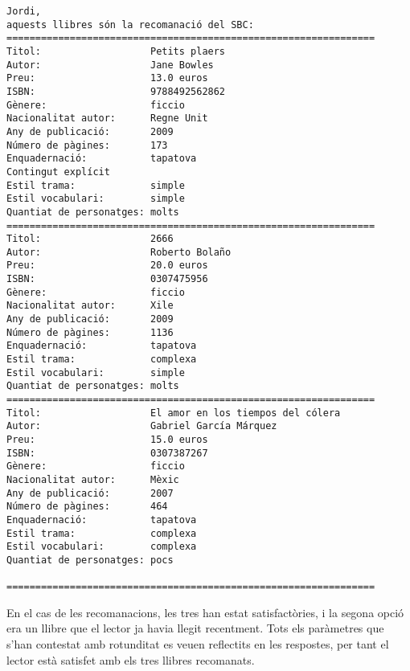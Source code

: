 \begin{verbatim}
Jordi, 
aquests llibres són la recomanació del SBC: 
================================================================
Titol:                   Petits plaers
Autor:                   Jane Bowles
Preu:                    13.0 euros
ISBN:                    9788492562862
Gènere:                  ficcio
Nacionalitat autor:      Regne Unit
Any de publicació:       2009
Número de pàgines:       173
Enquadernació:           tapatova
Contingut explícit
Estil trama:             simple
Estil vocabulari:        simple
Quantiat de personatges: molts
================================================================
Titol:                   2666
Autor:                   Roberto Bolaño
Preu:                    20.0 euros
ISBN:                    0307475956
Gènere:                  ficcio
Nacionalitat autor:      Xile
Any de publicació:       2009
Número de pàgines:       1136
Enquadernació:           tapatova
Estil trama:             complexa
Estil vocabulari:        simple
Quantiat de personatges: molts
================================================================
Titol:                   El amor en los tiempos del cólera
Autor:                   Gabriel García Márquez
Preu:                    15.0 euros
ISBN:                    0307387267
Gènere:                  ficcio
Nacionalitat autor:      Mèxic
Any de publicació:       2007
Número de pàgines:       464
Enquadernació:           tapatova
Estil trama:             complexa
Estil vocabulari:        complexa
Quantiat de personatges: pocs

================================================================
\end{verbatim}

En el cas de les recomanacions, les tres han estat satisfactòries, i la segona opció era un llibre que el lector ja havia llegit recentment. Tots els paràmetres que s'han contestat amb rotunditat es veuen reflectits en les respostes, per tant el lector està satisfet amb els tres llibres recomanats.


